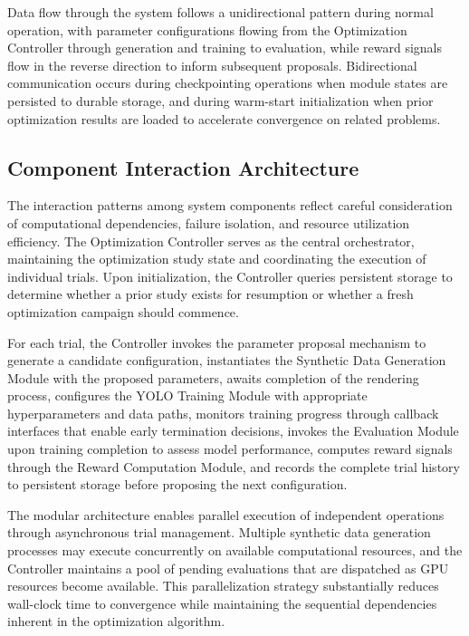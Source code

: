 Data flow through the system follows a unidirectional pattern during normal operation, with parameter configurations flowing from the Optimization Controller through generation and training to evaluation, while reward signals flow in the reverse direction to inform subsequent proposals. Bidirectional communication occurs during checkpointing operations when module states are persisted to durable storage, and during warm-start initialization when prior optimization results are loaded to accelerate convergence on related problems.

\subsection{Component Interaction Architecture}

The interaction patterns among system components reflect careful consideration of computational dependencies, failure isolation, and resource utilization efficiency. The Optimization Controller serves as the central orchestrator, maintaining the optimization study state and coordinating the execution of individual trials. Upon initialization, the Controller queries persistent storage to determine whether a prior study exists for resumption or whether a fresh optimization campaign should commence.

For each trial, the Controller invokes the parameter proposal mechanism to generate a candidate configuration, instantiates the Synthetic Data Generation Module with the proposed parameters, awaits completion of the rendering process, configures the YOLO Training Module with appropriate hyperparameters and data paths, monitors training progress through callback interfaces that enable early termination decisions, invokes the Evaluation Module upon training completion to assess model performance, computes reward signals through the Reward Computation Module, and records the complete trial history to persistent storage before proposing the next configuration.

The modular architecture enables parallel execution of independent operations through asynchronous trial management. Multiple synthetic data generation processes may execute concurrently on available computational resources, and the Controller maintains a pool of pending evaluations that are dispatched as GPU resources become available. This parallelization strategy substantially reduces wall-clock time to convergence while maintaining the sequential dependencies inherent in the optimization algorithm.

